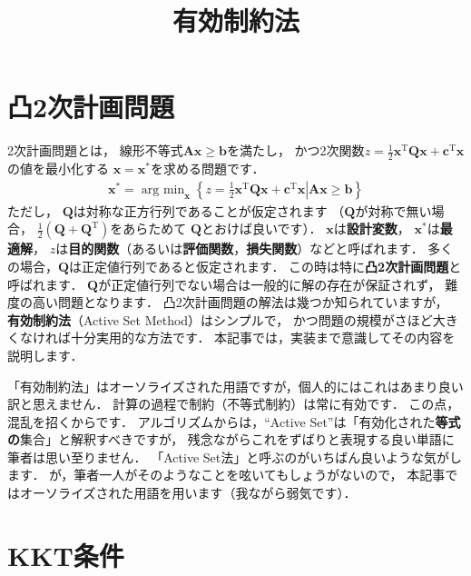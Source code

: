 ﻿\documentclass{jsarticle}
\title{有効制約法}
\begin{document}
\maketitle

\section{凸2次計画問題}

2次計画問題とは，
線形不等式$\boldsymbol{A}\boldsymbol{x}\geq\boldsymbol{b}$を満たし，
かつ2次関数$z=\frac{1}{2}\boldsymbol{x}^{\mathrm{T}}\boldsymbol{Q}\boldsymbol{x}+\boldsymbol{c}^{\mathrm{T}}\boldsymbol{x}$の値を最小化する
$\boldsymbol{x}=\boldsymbol{x}^{*}$を求める問題です．
\begin{align*}
\boldsymbol{x}^{*}=\mathop{\mathrm{arg~min}}_{\boldsymbol{x}}\left\{
\left.
z=\frac{1}{2}\boldsymbol{x}^{\mathrm{T}}\boldsymbol{Q}\boldsymbol{x}+\boldsymbol{c}^{\mathrm{T}}\boldsymbol{x}
\right|
\boldsymbol{A}\boldsymbol{x}\geq\boldsymbol{b}
\right\}
\end{align*}
ただし，
$\boldsymbol{Q}$は対称な正方行列であることが仮定されます
（$\boldsymbol{Q}$が対称で無い場合，
$\frac{1}{2}\left(\boldsymbol{Q}+\boldsymbol{Q}^{\mathrm{T}}\right)$をあらためて
$\boldsymbol{Q}$とおけば良いです）．
$\boldsymbol{x}$は{\bf 設計変数}，
$\boldsymbol{x}^{*}$は{\bf 最適解}，
$z$は{\bf 目的関数}（あるいは{\bf 評価関数}，{\bf 損失関数}）などと呼ばれます．
多くの場合，$\boldsymbol{Q}$は正定値行列であると仮定されます．
この時は特に{\bf 凸2次計画問題}と呼ばれます．
$\boldsymbol{Q}$が正定値行列でない場合は一般的に解の存在が保証されず，
難度の高い問題となります．
凸2次計画問題の解法は幾つか知られていますが，
{\bf 有効制約法}（Active Set Method）はシンプルで，
かつ問題の規模がさほど大きくなければ十分実用的な方法です．
本記事では，実装まで意識してその内容を説明します．


「有効制約法」はオーソライズされた用語ですが，個人的にはこれはあまり良い訳と思えません．
計算の過程で制約（不等式制約）は常に有効です．
この点，混乱を招くからです．
アルゴリズムからは，``Active Set''は「有効化された{\bf 等式の}集合」と解釈すべきですが，
残念ながらこれをずばりと表現する良い単語に筆者は思い至りません．
「Active Set法」と呼ぶのがいちばん良いような気がします．
が，筆者一人がそのようなことを呟いてもしょうがないので，
本記事ではオーソライズされた用語を用います（我ながら弱気です）．



\section{KKT条件}
\end{document}
